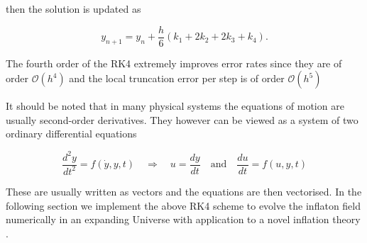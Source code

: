 then the solution is updated as

\begin{equation}
    y_{n+1}=y_n+\frac{h}{6}\left(k_1+2k_2+2k_3+k_4\right).
\end{equation}

The fourth order of the RK4 extremely improves error rates since they are of order $\mathcal{O}(h^4)$ and the local truncation error per step is of order $\mathcal{O}(h^5)$

It should be noted that in many physical systems the equations of motion are usually second-order derivatives. They however can be viewed as a system of two ordinary differential equations

\begin{equation}
    \frac{d^2 y}{dt^2} = f(\dot{y}, y, t) \quad \Rightarrow \quad
        u = \frac{dy}{dt} \quad \text {and} \quad
        \frac{du}{dt} = f(u, y, t)
\end{equation}

These are usually written as vectors and the equations are then vectorised. In the following section we implement the above RK4 scheme to evolve the inflaton field numerically in an expanding Universe with application to a novel inflation theory \cite{dimopoulos2002modeling}.